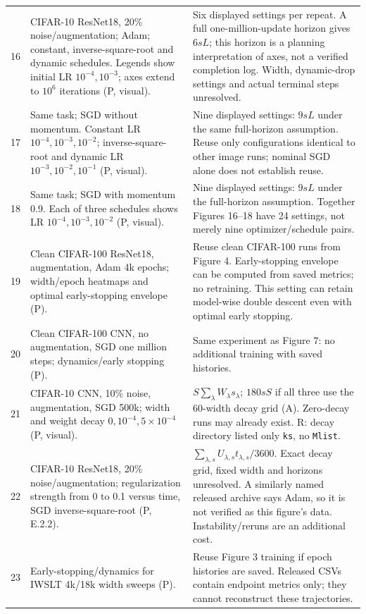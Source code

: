 \documentclass{article}
\begin{document}
\begin{longtable}{@{}P{0.32in}P{3.47in}P{2.9in}@{}}
16 & CIFAR-10 ResNet18, 20\% noise/augmentation; Adam; constant, inverse-square-root and dynamic schedules. Legends show initial LR $10^{-4},10^{-3}$; axes extend to $10^6$ iterations (P, visual). & Six displayed settings per repeat. A full one-million-update horizon gives $6sL$; this horizon is a planning interpretation of axes, not a verified completion log. Width, dynamic-drop settings and actual terminal steps unresolved.\\
17 & Same task; SGD without momentum. Constant LR $10^{-4},10^{-3},10^{-2}$; inverse-square-root and dynamic LR $10^{-3},10^{-2},10^{-1}$ (P, visual). & Nine displayed settings: $9sL$ under the same full-horizon assumption. Reuse only configurations identical to other image runs; nominal SGD alone does not establish reuse.\\
18 & Same task; SGD with momentum 0.9. Each of three schedules shows LR $10^{-4},10^{-3},10^{-2}$ (P, visual). & Nine displayed settings: $9sL$ under the full-horizon assumption. Together Figures 16--18 have 24 settings, not merely nine optimizer/schedule pairs.\\
19 & Clean CIFAR-100 ResNet18, augmentation, Adam 4k epochs; width/epoch heatmaps and optimal early-stopping envelope (P). & Reuse clean CIFAR-100 runs from Figure 4. Early-stopping envelope can be computed from saved metrics; no retraining. This setting can retain model-wise double descent even with optimal early stopping.\\
20 & Clean CIFAR-100 CNN, no augmentation, SGD one million steps; dynamics/early stopping (P). & Same experiment as Figure 7: no additional training with saved histories.\\
21 & CIFAR-10 CNN, 10\% noise, augmentation, SGD 500k; width and weight decay $0,10^{-4},5\times10^{-4}$ (P, visual). & $S\sum_\lambda W_\lambda s_\lambda$; $180sS$ if all three use the 60-width decay grid (A). Zero-decay runs may already exist. R: decay directory listed only \texttt{ks}, no \texttt{Mlist}.\\
22 & CIFAR-10 ResNet18, 20\% noise/augmentation; regularization strength from 0 to 0.1 versus time, SGD inverse-square-root (P, E.2.2). & $\sum_{\lambda,s}U_{\lambda,s}t_{\lambda,s}/3600$. Exact decay grid, fixed width and horizons unresolved. A similarly named released archive says Adam, so it is not verified as this figure's data. Instability/reruns are an additional cost.\\
23 & Early-stopping/dynamics for IWSLT 4k/18k width sweeps (P). & Reuse Figure 3 training if epoch histories are saved. Released CSVs contain endpoint metrics only; they cannot reconstruct these trajectories.\\

\end{longtable}
\end{document}
